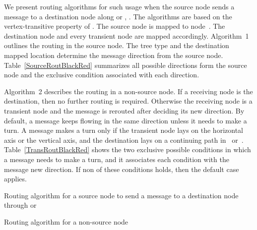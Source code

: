 \documentclass[12pt,journal,compsoc,onecolumn,]{IEEEtran}
\begin{document}
{We present routing algorithms for such usage when the source node
 sends a message to a destination node 
along  or , . The algorithms are based on the vertex-transitive property of .
The source node is mapped to node~. The destination node and every transient
node are mapped accordingly.
Algorithm~1 outlines the routing in the source node.
The tree type and the destination mapped location determine the message direction
from the source node.
Table~\ref{SourceRoutBlackRed} summarizes all possible directions form the source node and the exclusive condition
associated with each direction.

Algorithm~2 describes the routing in a non-source node. If a receiving node is the destination,
then no further routing is required.
Otherwise the receiving node is a transient node and the message is rerouted after deciding its new direction.
By default, a message keeps flowing in the same direction unless it needs to make a turn.
A message makes a turn only if the transient node lays on the horizontal axis or the vertical axis,
and the destination lays on a continuing path in~ or~.
Table~\ref{TransRoutBlackRed} shows the two exclusive possible conditions in which a message needs to make a turn,
and it associates each condition with the message new direction. If non of these conditions holds, then the default case
applies.

\begin{algorithm}[H]
\caption{Routing algorithm for a source node  to send a message
to a destination node  through  or }
\end{algorithm}


\begin{algorithm}[H]
\caption{Routing algorithm for a non-source node }
\end{algorithm}


}
\end{document}
